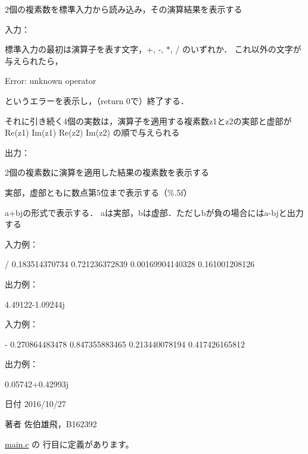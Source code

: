 2個の複素数を標準入力から読み込み，その演算結果を表示する 

入力：
\begin{DoxyItemize}
\item 標準入力の最初は演算子を表す文字，+, -\/, $\ast$, / のいずれか． これ以外の文字が与えられたら， \begin{DoxyVerb}Error: unknown operator
\end{DoxyVerb}
 というエラーを表示し，（return 0で）終了する．
\item それに引き続く4個の実数は，演算子を適用する複素数z1とz2の実部と虚部が Re(z1) Im(z1) Re(z2) Im(z2) の順で与えられる
\end{DoxyItemize}

出力：
\begin{DoxyItemize}
\item 2個の複素数に演算を適用した結果の複素数を表示する
\item 実部，虚部ともに数点第5位まで表示する（\%.5f）
\item a+bjの形式で表示する． aは実部，bは虚部．ただしbが負の場合にはa-\/bjと出力する
\end{DoxyItemize}

入力例： \begin{DoxyVerb}/ 0.183514370734 0.721236372839 0.00169904140328 0.161001208126
\end{DoxyVerb}
 出力例： \begin{DoxyVerb}4.49122-1.09244j
\end{DoxyVerb}
 入力例： \begin{DoxyVerb}- 0.270864483478 0.847355883465 0.213440078194 0.417426165812
\end{DoxyVerb}
 出力例： \begin{DoxyVerb}0.05742+0.42993j
\end{DoxyVerb}
 \begin{DoxyDate}{日付}
2016/10/27 
\end{DoxyDate}
\begin{DoxyAuthor}{著者}
佐伯雄飛，\-B162392 
\end{DoxyAuthor}


 \hyperlink{main_8c_source}{main.\-c} の  行目に定義があります。


